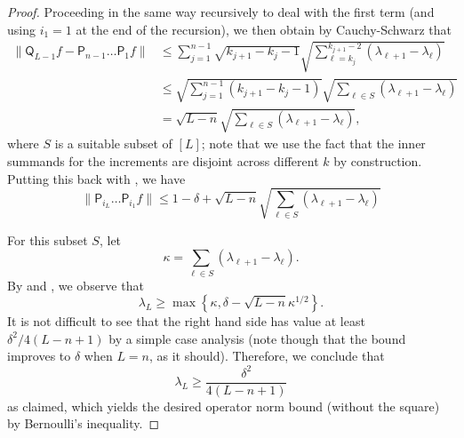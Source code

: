 \documentclass[10pt,a4paper]{amsart}
\begin{document}
\begin{proof}
Proceeding in the same way recursively to deal with the first term (and using $i_1=1$ at the end of the recursion), we then obtain by Cauchy-Schwarz that
\begin{align*}
    \|\mathsf{Q}_{{L-1}}f-\mathsf{P}_{n-1}\ldots \mathsf{P}_1f\|&\leq \sum_{j=1}^{n-1} \sqrt{k_{j+1}-k_{j}-1}\sqrt{\sum_{\ell=k_{j}}^{k_{j+1}-2} (\lambda_{\ell+1}-\lambda_{\ell})} \nonumber\\
    &\leq \sqrt{\sum_{j=1}^{n-1} (k_{j+1}-k_j-1)}\sqrt{\sum_{\ell\in S}(\lambda_{\ell+1}-\lambda_{\ell})}\nonumber\\
    &=\sqrt{L-n}\sqrt{\sum_{\ell\in S}(\lambda_{\ell+1}-\lambda_{\ell})},
\end{align*}
where $S$ is a suitable subset of $[L]$; note that we use the fact that the inner summands for the increments are disjoint across different $k$ by construction. Putting this back with , we have
\begin{equation}
\label{eq:bound_2}
    \|\mathsf{P}_{i_{L}}\ldots \mathsf{P}_{i_1}f\|\leq 1-\delta+ \sqrt{L-n}\sqrt{\sum_{\ell\in S}(\lambda_{\ell+1}-\lambda_{\ell})}
\end{equation}

For this subset $S$, let 
\begin{equation*}
    \kappa = \sum_{\ell\in S}(\lambda_{\ell+1}-\lambda_{\ell}).
\end{equation*}
By  and , we observe that
\begin{equation*}
    \lambda_L \geq \max\left\{\kappa,\delta- \sqrt{L-n}\kappa^{1/2} \right\}.
\end{equation*}
It is not difficult to see that the right hand side  has value at least $\delta^2/4(L-n+1)$ by a simple case analysis (note  though that the bound improves to $\delta$ when $L=n$, as it should). Therefore, we conclude that 
\begin{equation*}
    \lambda_L\geq \frac{\delta^2}{4(L-n+1)}
\end{equation*}
as claimed, which yields the desired operator norm bound (without the square) by Bernoulli's inequality.
\end{proof}
\end{document}

